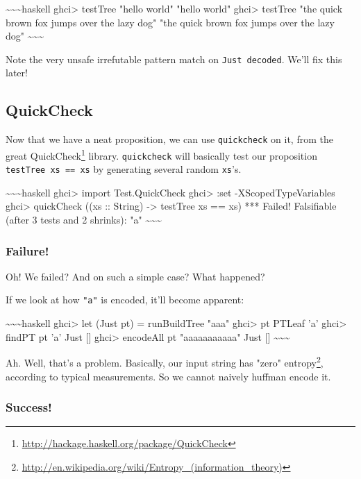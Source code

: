 \documentclass[]{article}
\renewcommand{\href}[2]{#2\footnote{\url{#1}}}
\begin{document}
\textasciitilde{}\textasciitilde{}\textasciitilde{}haskell ghci\textgreater{}
testTree "hello world" "hello world" ghci\textgreater{} testTree "the quick
brown fox jumps over the lazy dog" "the quick brown fox jumps over the lazy dog"
\textasciitilde{}\textasciitilde{}\textasciitilde{}

Note the very unsafe irrefutable pattern match on \texttt{Just\ decoded}. We'll
fix this later!

\subsection{QuickCheck}

Now that we have a neat proposition, we can use \texttt{quickcheck} on it, from
the great \href{http://hackage.haskell.org/package/QuickCheck}{QuickCheck}
library. \texttt{quickcheck} will basically test our proposition
\texttt{testTree\ xs\ ==\ xs} by generating several random \texttt{xs}'s.

\textasciitilde{}\textasciitilde{}\textasciitilde{}haskell ghci\textgreater{}
import Test.QuickCheck ghci\textgreater{} :set -XScopedTypeVariables
ghci\textgreater{} quickCheck ((xs :: String) -\textgreater{} testTree xs == xs)
*** Failed! Falsifiable (after 3 tests and 2 shrinks): "a"
\textasciitilde{}\textasciitilde{}\textasciitilde{}

\subsubsection{Failure!}

Oh! We failed? And on such a simple case? What happened?

If we look at how \texttt{"a"} is encoded, it'll become apparent:

\textasciitilde{}\textasciitilde{}\textasciitilde{}haskell ghci\textgreater{}
let (Just pt) = runBuildTree "aaa" ghci\textgreater{} pt PTLeaf 'a'
ghci\textgreater{} findPT pt 'a' Just {[}{]} ghci\textgreater{} encodeAll pt
"aaaaaaaaaaa" Just {[}{]} \textasciitilde{}\textasciitilde{}\textasciitilde{}

Ah. Well, that's a problem. Basically, our input string has
\href{http://en.wikipedia.org/wiki/Entropy_(information_theory)}{"zero"
entropy}, according to typical measurements. So we cannot naively huffman encode
it.

\subsubsection{Success!}
\end{document}
